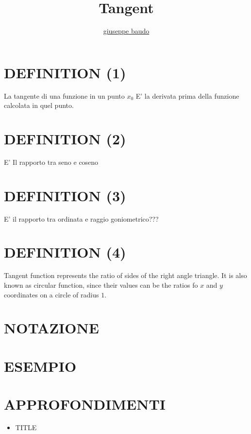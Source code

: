 \documentclass[a4paper,10pt]{article}
\title{Tangent}
\author{\href{http://www.baudo.hol.es}{giuseppe baudo}}
\begin{document}
\maketitle

\section{DEFINITION (1)}
La tangente di una funzione in un punto $x_0$ E' la derivata prima della funzione calcolata in quel punto.

\section{DEFINITION (2)}
E' Il rapporto tra seno e coseno

\section{DEFINITION (3)}
E' il rapporto tra ordinata e raggio goniometrico???

\section{DEFINITION (4)}
Tangent function represents the ratio of sides of the right angle triangle. It is also known as circular
function, since their values can be the ratios fo $x$ and $y$ coordinates on a circle of radius $1$.
\section{NOTAZIONE}

\section{ESEMPIO}

\section{APPROFONDIMENTI}
\begin{itemize}
 \item TITLE
\end{itemize}
\end{document}
